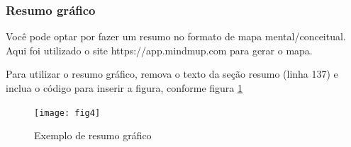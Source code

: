 \documentclass[	DIV=calc,%
							paper=a4,%
							fontsize=12pt,%
							onecolumn]{scrartcl}	 					%
\begin{document}
\clearpage
{}
\recalctypearea


\subsubsection{Resumo gráfico}

Você pode optar por fazer um resumo no formato de mapa mental/conceitual. 
Aqui foi utilizado o site https://app.mindmup.com para gerar o mapa.

Para utilizar o resumo gráfico, remova o texto da seção resumo (linha 137) e inclua o código para inserir a figura, conforme figura \ref{fig6}

\begin{figure}[h]
	\centering
	\texttt{[image: fig4]}
	\caption{Exemplo de resumo gráfico}
	\label{fig6}	
\end{figure}

\end{document}
